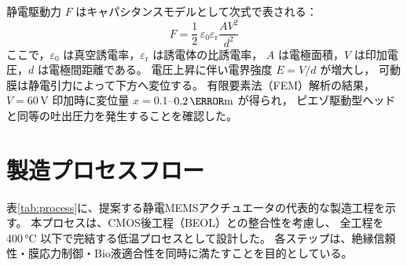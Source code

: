 \documentclass[conference]{IEEEtran}
\begin{document}
静電駆動力 $F$ はキャパシタンスモデルとして次式で表される：
\[
F = \frac{1}{2}\,\varepsilon_0 \varepsilon_{\mathrm{r}} \frac{A V^2}{d^2}
\]
ここで，$\varepsilon_0$ は真空誘電率，$\varepsilon_{\mathrm{r}}$ は誘電体の比誘電率，
$A$ は電極面積，$V$ は印加電圧，$d$ は電極間距離である。
電圧上昇に伴い電界強度 $E = V/d$ が増大し，
可動膜は静電引力によって下方へ変位する。
有限要素法（FEM）解析の結果，
$V=60\,\mathrm{V}$ 印加時に変位量 $x = 0.1$–$0.2\,\mathrm{\micro m}$ が得られ，
ピエゾ駆動型ヘッドと同等の吐出圧力を発生することを確認した。

\section{製造プロセスフロー}
表\ref{tab:process}に、提案する静電MEMSアクチュエータの代表的な製造工程を示す。
本プロセスは、CMOS後工程（BEOL）との整合性を考慮し、
全工程を 400\,°C 以下で完結する低温プロセスとして設計した。
各ステップは、絶縁信頼性・膜応力制御・Bio液適合性を同時に満たすことを目的としている。

\begin{table}[t]
\centering
\caption{静電MEMSアクチュエータの代表的製造プロセス（400\,°C以下）}
\label{tab:process}
\end{table}
\end{document}

